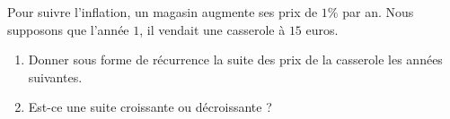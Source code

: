 
\begin{exercice}\label{exosmath-0159}

    Pour suivre l'inflation, un magasin augmente ses prix de \( 1\%\) par an. Nous supposons que l'année \( 1\), il vendait une casserole à \( 15\) euros.
    \begin{enumerate}
        \item
            Donner sous forme de récurrence la suite des prix de la casserole les années suivantes.
        \item
            Est-ce une suite croissante ou décroissante ?
    \end{enumerate}

\end{exercice}
